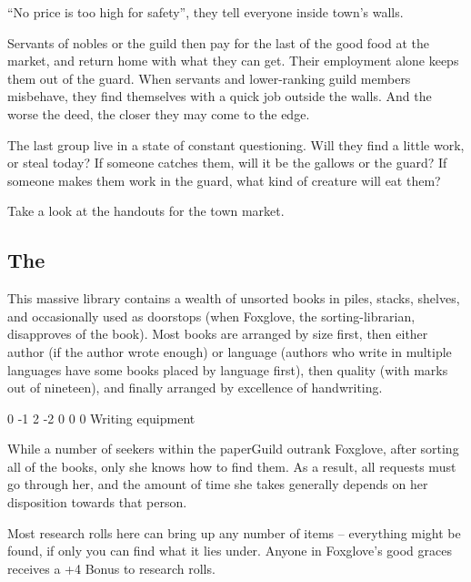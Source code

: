 ``No price is too high for safety'', they tell everyone inside \gls{town}'s walls.

Servants of nobles or the guild then pay for the last of the good food at the market, and return home with what they can get.
Their employment alone keeps them out of the \gls{guard}.
When servants and lower-ranking guild members misbehave, they find themselves with a quick job outside the walls.
And the worse the deed, the closer they may come to the \gls{edge}.

The last group live in a state of constant questioning.
Will they find a little work, or steal today?
If someone catches them, will it be the gallows or the guard?
If someone makes them work in the \gls{guard}, what kind of creature will eat them?

Take a look at the handouts for the \gls{town} market.

\subsection{The }
\label{paperGuild}

This massive library contains a wealth of unsorted books in piles, stacks, shelves, and occasionally used as doorstops (when Foxglove, the sorting-librarian, disapproves of the book).
Most books are arranged by size first, then either author (if the author wrote enough) or language (authors who write in multiple languages have some books placed by language first), then quality (with marks out of nineteen), and finally arranged by excellence of handwriting.


{0}%
{-1}%
{{2}%
{-2}%
{0}}%
{0}%
{0}%
{}%
{Writing equipment}%
{
  \setcounter{Academics}{3}
  \setcounter{Crafts}{1}
  \setcounter{Empathy}{1}
}

While a number of \glspl{seeker} within the \gls{paperGuild} outrank Foxglove, after sorting all of the books, only she knows how to find them.
As a result, all requests must go through her, and the amount of time she takes generally depends on her disposition towards that person.

Most research rolls here can bring up any number of items -- everything might be found, if only you can find what it lies under.
Anyone in Foxglove's good graces receives a +4 Bonus to research rolls.

